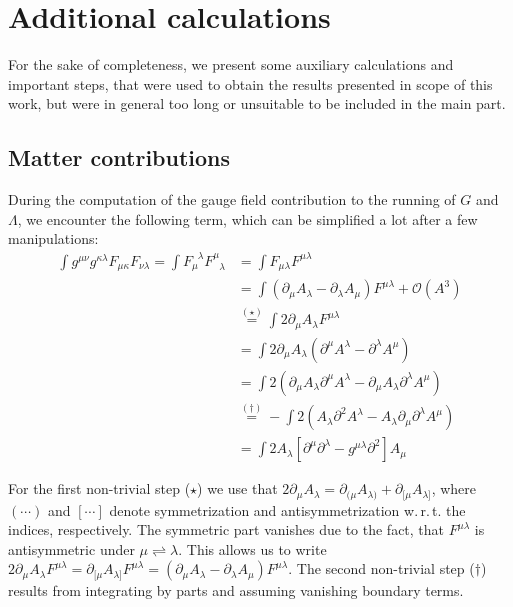\chapter{Additional calculations}\label{chap:AppB}
For the sake of completeness, we present some auxiliary calculations and important steps, that were used to obtain the results presented in scope of this work, but were in general too long or unsuitable to be included in the main part.
\section{Matter contributions}
During the computation of the gauge field contribution to the running of $G$ and $\Lambda$, we encounter the following term, which can be simplified a lot after a few manipulations:
\begin{align}\label{eqn:FF2} 
\int g^{\mu\nu}g^{\kappa\lambda} F_{\mu\kappa}F_{\nu\lambda} = \int F_{\mu}^{\phantom{\mu}\lambda}F_{\phantom{\mu}\lambda}^{\mu}	&= \int  F_{\mu\lambda}F^{\mu\lambda} \nonumber	\\
&= \int \left(\partial_{\mu}A_{\lambda} - \partial_{\lambda}A_{\mu}\right)F^{\mu\lambda} + \mathcal{O}\left(A^3\right)\nonumber \\
&\overset{(\star)}{=} \int 2\partial_{\mu}A_{\lambda} F^{\mu\lambda}\nonumber  \\
&=  \int 2\partial_{\mu}A_{\lambda}\left(\partial^{\mu}A^{\lambda} - \partial^{\lambda}A^{\mu}\right) \\
&= \int 2\left(\partial_{\mu}A_{\lambda}\partial^{\mu}A^{\lambda} - \partial_{\mu}A_{\lambda}\partial^{\lambda}A^{\mu}\right) \nonumber\\
&\overset{(\dagger)}{=} -\int 2\left( A_{\lambda}\partial^2A^{\lambda} - A_{\lambda}\partial_{\mu}\partial^{\lambda}A^{\mu}\right) \nonumber\\
&= \int 2A_{\lambda}\left[\partial^{\mu}\partial^{\lambda} - g^{\mu\lambda}\partial^2\right]A_{\mu}\nonumber 
\end{align}

For the first non-trivial step ($\star$) we use that $2\partial_{\mu}A_{\lambda} = \partial_{(\mu}A_{\lambda)} + \partial_{[\mu}A_{\lambda]}$, where $(\cdots)$ and $[\cdots]$ denote symmetrization and antisymmetrization w.\,r.\,t. the indices, respectively. The symmetric part vanishes due to the fact, that $F^{\mu\lambda}$ is antisymmetric under $\mu \rightleftharpoons \lambda$. This allows us to write $2\partial_{\mu}A_{\lambda}F^{\mu\lambda} = \partial_{[\mu}A_{\lambda]}F^{\mu\lambda} = \left(\partial_{\mu}A_{\lambda} - \partial_{\lambda}A_{\mu}\right)F^{\mu\lambda}$. The  second non-trivial step ($\dagger$) results from integrating by parts and assuming vanishing boundary terms.